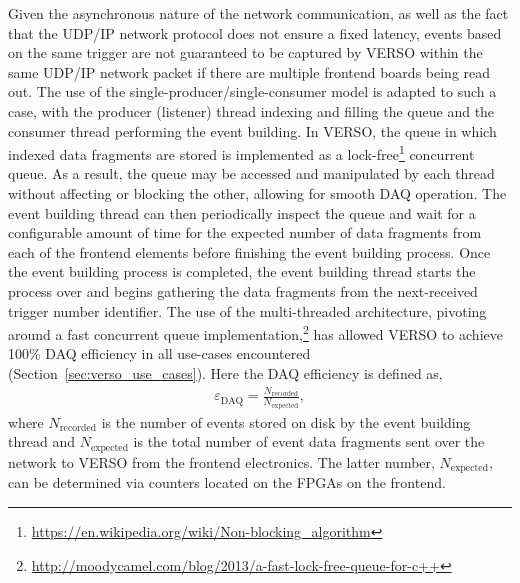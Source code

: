 Given the asynchronous nature of the network communication, as well as the fact that the UDP/IP
network protocol does not ensure a fixed latency, events based on the same trigger
are not guaranteed to be captured by VERSO within the same UDP/IP network packet if there are multiple frontend boards being read out.
The use of the single-producer/single-consumer model is adapted to such a case, with
the producer (listener) thread indexing and filling the queue and the consumer thread performing the event building.
In VERSO, the queue in which indexed data fragments are stored is implemented
as a lock-free\footnote{\url{https://en.wikipedia.org/wiki/Non-blocking_algorithm}} concurrent queue.
As a result, the queue may be accessed and manipulated by each thread without affecting or blocking
the other, allowing for smooth DAQ operation.
The event building thread can then periodically inspect the queue and wait for a configurable amount of time for the expected
number of data fragments from each of the frontend elements before finishing
the event building process.
Once the event building process is completed,
the event building thread starts the process over and begins gathering the data fragments from the next-received trigger number identifier.
The use of the multi-threaded architecture, pivoting around a fast concurrent queue
implementation,\footnote{\url{http://moodycamel.com/blog/2013/a-fast-lock-free-queue-for-c++}}
has allowed VERSO to achieve 100\% DAQ efficiency
in all use-cases encountered (Section~\ref{sec:verso_use_cases}).
Here the DAQ efficiency is defined as,
\begin{align}
    \varepsilon_{\text{DAQ}} = \frac{ N_{\text{recorded}} }{ N_{\text{expected}} },
    \label{eq:verso_daq_eff}
\end{align}
where $N_{\text{recorded}}$ is the number of events stored on disk by the event building
thread and $N_{\text{expected}}$ is the total number of event data fragments sent
over the network to VERSO from the frontend electronics.
The latter number, $N_{\text{expected}}$, can be determined via counters located
on the FPGAs on the frontend.

\FloatBarrier
